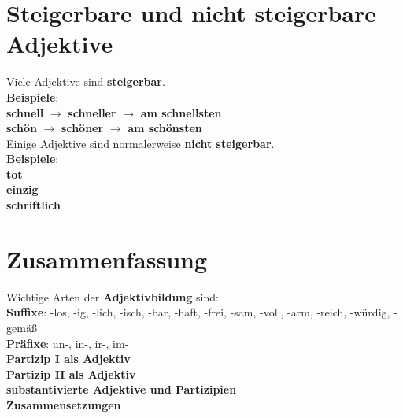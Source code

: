 \documentclass[a4paper]{article}
\begin{document}
    
    \section{Steigerbare und nicht steigerbare Adjektive}
        Viele Adjektive sind \textbf{steigerbar}.\\
        \textbf{Beispiele}:\\
        \textbf{schnell} $\rightarrow$ \textbf{schneller} $\rightarrow$ \textbf{am schnellsten}\\
        \textbf{sch\"on} $\rightarrow$ \textbf{sch\"oner} $\rightarrow$ \textbf{am sch\"onsten}\\
        Einige Adjektive sind normalerweise \textbf{nicht steigerbar}.\\
        \textbf{Beispiele}:\\
        \textbf{tot}\\
        \textbf{einzig}\\
        \textbf{schriftlich}\\
    
    
    \section{Zusammenfassung}
        Wichtige Arten der \textbf{Adjektivbildung} sind:\\
        \textbf{Suffixe}: -los, -ig, -lich, -isch, -bar, -haft, -frei, -sam, -voll, -arm, -reich, -w\"urdig, -gem\"a\ss\\
        \textbf{Pr\"afixe}: un-, in-, ir-, im-\\
        \textbf{Partizip I als Adjektiv}\\
        \textbf{Partizip II als Adjektiv}\\
        \textbf{substantivierte Adjektive und Partizipien}\\
        \textbf{Zusammensetzungen}\\

%
%
\end{document}

